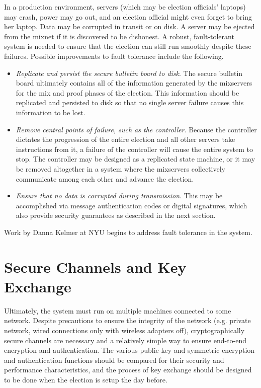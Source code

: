In a production environment, servers (which may be election officials' laptops) may crash, power may go out, and an election official might even forget to bring her laptop. Data may be corrupted in transit or on disk. A server may be ejected from the mixnet if it is discovered to be dishonest. A robust, fault-tolerant system is needed to ensure that the election can still run smoothly despite these failures. Possible improvements to fault tolerance include the following.
\begin{itemize}
\item \emph{Replicate and persist the secure bulletin board to disk}. The secure bulletin board ultimately contains all of the information generated by the mixservers for the mix and proof phases of the election. This information should be replicated and persisted to disk so that no single server failure causes this information to be lost.
\item \emph{Remove central points of failure, such as the controller}. Because the controller dictates the progression of the entire election and all other servers take instructions from it, a failure of the controller will cause the entire system to stop. The controller may be designed as a replicated state machine, or it may be removed altogether in a system where the mixservers collectively communicate among each other and advance the election.
\item \emph{Ensure that no data is corrupted during transmission}. This may be accomplished via message authentication codes or digital signatures, which also provide security guarantees as described in the next section.
\end{itemize}
Work by Danna Kelmer at NYU begins to address fault tolerance in the system.

\section{Secure Channels and Key Exchange}

Ultimately, the system must run on multiple machines connected to some network. Despite precautions to ensure the integrity of the network (e.g. private network, wired connections only with wireless adapters off), cryptographically secure channels are necessary and a relatively simple way to ensure end-to-end encryption and authentication. The various public-key and symmetric encryption and authentication functions should be compared for their security and performance characteristics, and the process of key exchange should be designed to be done when the election is setup the day before.
